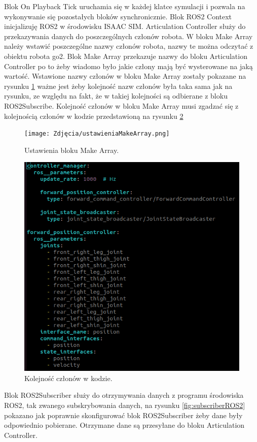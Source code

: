 \documentclass[12pt]{article}
\begin{document}
\noindent Blok On Playback Tick uruchamia się w każdej klatce symulacji i pozwala na wykonywanie się pozostałych bloków synchronicznie. Blok ROS2 Context inicjalizuję ROS2 w środowisku ISAAC SIM. Articulation Controller służy do przekazywania danych do poszczególnych członów robota. W bloku Make Array należy wstawić poszczególne nazwy członów robota, nazwy te można odczytać z obiektu robota go2. Blok Make Array przekazuje nazwy do bloku Articulation Controller po to żeby wiadomo było jakie człony mają być wysterowane na jaką wartość. Wstawione nazwy członów w bloku Make Array zostały pokazane na rysunku \ref{fig:makeArray} ważne jest żeby kolejność nazw członów była taka sama jak na rysunku, ze względu na fakt, że w takiej kolejności są odbierane z bloku ROS2Subscribe. Kolejność członów w bloku Make Array musi zgadzać się z~ kolejnością członów w kodzie przedstawioną na rysunku \ref{kolejnoscJointow}\\


\begin{figure}[h]
    \centering
    \texttt{[image: Zdjęcia/ustawieniaMakeArray.png]}
    \caption{Ustawienia bloku Make Array.}
    \label{fig:makeArray}
\end{figure}

\begin{figure}
    \centering
    \includegraphics[width=0.5\linewidth]{Zdjęcia/kolejnoscJointow.png}
    \caption{Kolejność członów w kodzie.}
    \label{kolejnoscJointow}
\end{figure}

\noindent Blok ROS2Subscriber służy do otrzymywania danych z programu środowiska ROS2, tak zwanego subskrybowania danych, na rysunku \ref{fig:subscriberROS2} pokazano jak poprawnie skonfigurować blok ROS2Subscriber żeby dane były odpowiednio pobierane. Otrzymane dane są przesyłane do bloku Articulation Controller.\\
\end{document}
